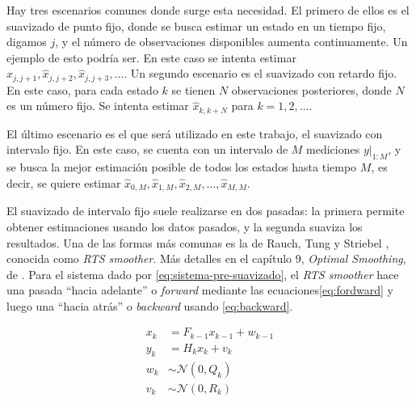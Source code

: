 Hay tres escenarios comunes donde surge esta necesidad. El primero de ellos es el suavizado de punto fijo, donde se busca estimar un estado en un tiempo fijo, digamos \(j\), y el número de observaciones disponibles aumenta continuamente. Un ejemplo de esto podría ser. En este caso se intenta estimar \(\hat{x}_{j, j+1}, \hat{x}_{j, j+2}, \hat{x}_{j, j+3}, \dots\). Un segundo escenario es el suavizado con retardo fijo. En este caso, para cada estado \(k\) se tienen \(N\) observaciones posteriores, donde \(N\) es un número fijo. Se intenta estimar \(\hat{x}_{k, k+N}\) para \(k = 1, 2, \dots\). 

El último escenario es el que será utilizado en este trabajo, el suavizado con intervalo fijo. En este caso, se cuenta con un intervalo de \(M\) mediciones \(\left. y \right|_{1:M}\), y se busca la mejor estimación posible de todos los estados hasta tiempo \(M\), es decir, se quiere estimar \(\hat{x}_{0,M}, \hat{x}_{1,M}, \hat{x}_{2,M}, \dots, \hat{x}_{M,M}\). 


El suavizado de intervalo fijo suele realizarse en dos pasadas: la primera permite obtener estimaciones usando los datos pasados, y la segunda suaviza los resultados. Una de las formas más comunas es la de Rauch, Tung y Striebel \cite{Rauch1965}, conocida como \textit{RTS smoother}. Más detalles en el capítulo 9, \textit{Optimal Smoothing}, de \cite{Simon2006}. Para el sistema dado por \ref{eq:sistema-pre-suavizado}, el \textit{RTS smoother} hace una pasada ``hacia adelante'' o \textit{forward} mediante las ecuaciones\ref{eq:fordward} y luego una ``hacia atrás'' o \textit{backward} usando \ref{eq:backward}.




\begin{equation}\label{eq:sistema-pre-suavizado}
\begin{aligned}
x_k &= F_{k-1}x_{k-1} + w_{k-1} \\ 
y_k &= H_k x_k + v_k \\ 
w_k &\sim  \mathcal{N}(0, Q_k)\\
v_k &\sim  \mathcal{N}(0, R_k)
\end{aligned}
\end{equation}

